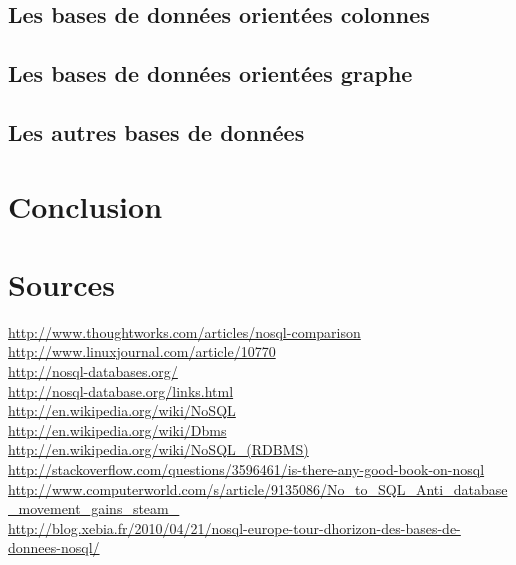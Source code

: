 \documentclass[11pt]{article}
\begin{document}
\subsection{Les bases de données orientées colonnes}

\subsection{Les bases de données orientées graphe}

\subsection{Les autres bases de données}

\section{Conclusion}

\section*{Sources}
\url{http://www.thoughtworks.com/articles/nosql-comparison} \\
\url{http://www.linuxjournal.com/article/10770} \\
\url{http://nosql-databases.org/} \\
\url{http://nosql-database.org/links.html} \\
\url{http://en.wikipedia.org/wiki/NoSQL} \\
\url{http://en.wikipedia.org/wiki/Dbms} \\
\url{http://en.wikipedia.org/wiki/NoSQL_(RDBMS)} \\
\url{http://stackoverflow.com/questions/3596461/is-there-any-good-book-on-nosql} \\
\url{http://www.computerworld.com/s/article/9135086/No_to_SQL_Anti_database_movement_gains_steam_} \\
\url{http://blog.xebia.fr/2010/04/21/nosql-europe-tour-dhorizon-des-bases-de-donnees-nosql/} \\
\end{document}
